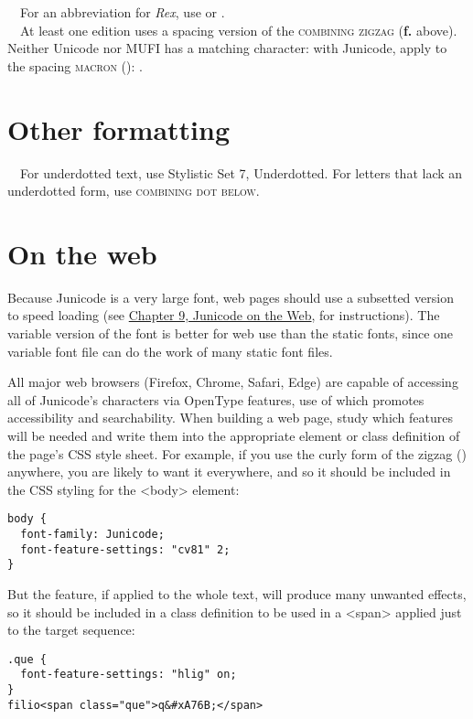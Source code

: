 \noindent{}\ \ For an abbreviation for \textit{Rex},
use \textex{\textrecipe}  or  .\\[1ex]

\noindent{}\ \ At least one edition uses a spacing version of the \textsc{combining zigzag}
(\textbf{f.} above).
Neither Unicode nor MUFI has a matching character: with Junicode, apply  to the spacing
\textsc{macron} (): .

\section[Other formatting]{Other formatting}
\ \ For underdotted text, use Stylistic Set 7, Underdotted. For letters that lack an underdotted form, use  \textsc{combining dot below}.

\section[On the web]{On the web}
Because Junicode is a very large font, web pages should use a subsetted version to speed loading
(see \hyperlink{OnTheWeb}{Chapter 9, Junicode on the Web}, for instructions).
The variable version of the font is better for web use than the
static fonts, since one variable font file can do the work of many static font files.

All major web browsers (Firefox, Chrome, Safari, Edge) are capable of accessing all of Junicode's characters via
OpenType features, use of which promotes accessibility and searchability. When building a web page, study which
features will be needed and write them into the appropriate element or class definition of the page's CSS style sheet.
For example, if you use the curly form of the zigzag () anywhere, you are likely to want it everywhere, and so it
should be included in the CSS styling for the <body> element:
\begin{verbatim}
body {
  font-family: Junicode;
  font-feature-settings: "cv81" 2;
}
\end{verbatim}

\noindent But the  feature, if applied to the whole text, 
will produce many unwanted effects, so it should be
included in a class definition to be used in a <span> applied just to the target sequence:
\begin{verbatim}
.que {
  font-feature-settings: "hlig" on;
}
filio<span class="que">q&#xA76B;</span>
\end{verbatim}

